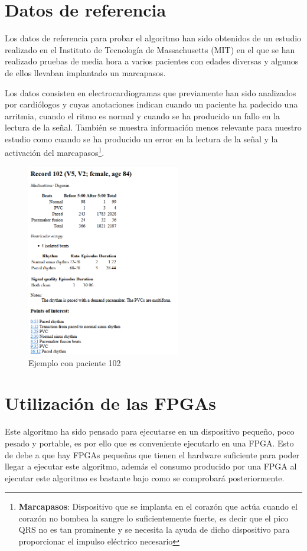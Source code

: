 \section{Datos de referencia}
Los datos de referencia para probar el algoritmo han sido obtenidos de un estudio realizado en el Instituto de Tecnología de Massachusetts (MIT) \cite{MIT} en el que se han realizado pruebas de media hora a varios pacientes con edades diversas y algunos de ellos llevaban implantado un marcapasos.

Los datos consisten en electrocardiogramas que previamente han sido analizados por cardiólogos y cuyas anotaciones indican cuando un paciente ha padecido una arritmia, cuando el ritmo es normal y cuando se ha producido un fallo en la lectura de la señal. También se muestra información menos relevante para nuestro 
estudio como cuando se ha producido un error en la lectura de la señal y la activación del marcapasos\footnote{\textbf{Marcapasos}: Dispositivo que se implanta en el corazón que actúa cuando el corazón no bombea la sangre lo suficientemente fuerte, es decir que el pico QRS no es tan prominente
y se necesita la ayuda de dicho dispositivo para proporcionar el impulso eléctrico necesario}.

\begin{figure}[h]
	\centering
	\includegraphics[width=0.6\textwidth]{./Images/img_introduccion/Paciente_pruebas_MIT.png}
	\caption{Ejemplo con paciente 102 \cite{mitdb}}
	\label{fig:Paciente_pruebas_MIT}
\end{figure}

\section{Utilización de las FPGAs}
Este algoritmo ha sido pensado para ejecutarse en un dispositivo pequeño, poco pesado y portable, es por ello que es conveniente ejecutarlo en una FPGA. Esto de debe a que hay FPGAs pequeñas que tienen el hardware suficiente para poder llegar a ejecutar este algoritmo, además el consumo producido por una FPGA al ejecutar este algoritmo es bastante bajo como se comprobará posteriormente.

